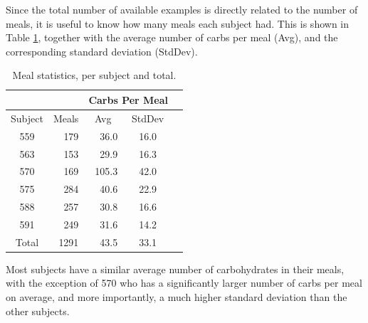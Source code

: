\documentclass{ecai}
\begin{document}
Since the total number of available examples is directly related to the number of meals, it is useful to know how many meals each subject had. This is shown in Table \ref{tab:meals}, together with the average number of carbs per meal (Avg), and the corresponding standard deviation (StdDev).
\begin{table}
\begin{center}
\caption{Meal statistics, per subject and total.}
\label{tab:meals}
\begin{tabular}{|c|r|r|c|c|}
    \cline{3-4}
    \multicolumn{2}{c}{} & \multicolumn{2}{|c|}{Carbs Per Meal}\\
	\hline
	Subject & \multicolumn{1}{c|}{Meals} & \multicolumn{1}{c|}{Avg} & StdDev\\
	\hline
	559 & 179 & 36.0 & 16.0\\
    563 & 153 & 29.9 & 16.3\\
    570 & 169 & 105.3 & 42.0\\
	575 & 284 & 40.6 & 22.9\\
	588 & 257 & 30.8 & 16.6\\
	591 & 249 & 31.6 & 14.2\\
	\hline
	Total & 1291 & 43.5 & 33.1\\
	\hline

\end{tabular}
\end{center}
\end{table}
Most subjects have a similar average number of carbohydrates in their meals, with the exception of 570 who has a significantly larger number of carbs per meal on average, and more importantly, a much higher standard deviation than the other subjects. 


\end{document}
